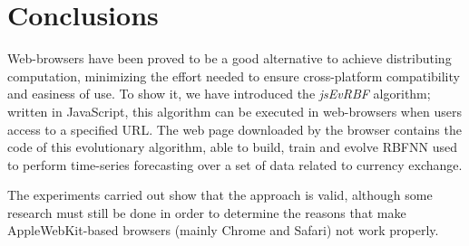 \documentclass{article}
\begin{document}
%
%


\section{Conclusions}
\label{sec:conclusions}
Web-browsers have been proved to be a good alternative to achieve
distributing computation, minimizing the effort needed to ensure
cross-platform compatibility and easiness of use. To show it, we have
introduced the {\em jsEvRBF} algorithm;
written in JavaScript, this algorithm can be executed in web-browsers
when users access to a specified URL. The web page downloaded by the
browser contains the code of this evolutionary algorithm, able to
build, train and evolve RBFNN used to perform time-series forecasting
over a set of data related to currency exchange. %

The experiments carried out show that the approach is valid,
although some research must still be done in order to determine the
reasons that make AppleWebKit-based browsers (mainly Chrome and
Safari) not work properly.
\end{document}
